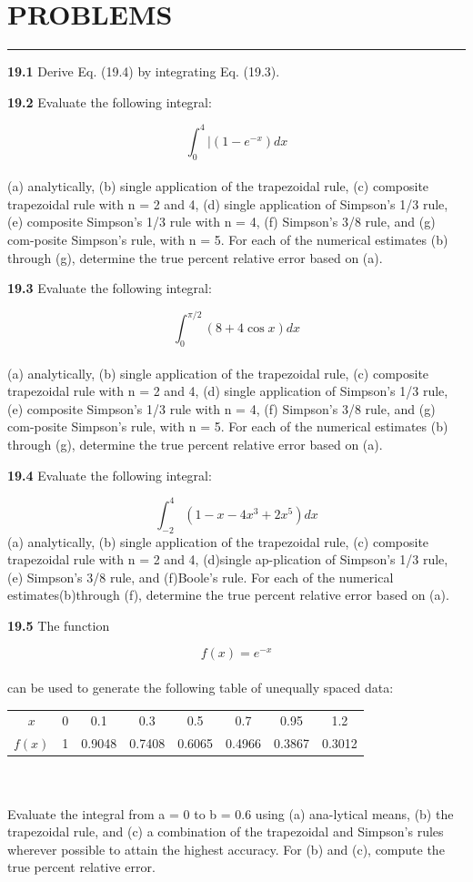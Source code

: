 \documentclass[../main.tex]{subfiles}
\begin{document}
\section*{PROBLEMS} \hrule

\begin{multicols}{2}
\textbf{19.1} Derive Eq. (19.4) by integrating Eq. (19.3).

\textbf{19.2} Evaluate the following integral:

	$$\int^{4}_{0}|(1-e^{-x})dx$$\\
(a) analytically, (b) single application of the trapezoidal rule,
(c) composite trapezoidal rule with n = 2 and 4, (d) single
application of Simpson's 1/3 rule, (e) composite Simpson's
1/3 rule with n = 4, (f) Simpson's 3/8 rule, and (g) com-posite Simpson's rule, with n = 5. For each of the numerical
estimates (b) through (g), determine the true percent relative
error based on (a).

\textbf{19.3} Evaluate the following integral:

	$$\int^{\pi/2}_{0}(8+4\cos{x})dx$$\\	
(a) analytically, (b) single application of the trapezoidal rule,
(c) composite trapezoidal rule with n = 2 and 4, (d) single
application of Simpson's 1/3 rule, (e) composite Simpson's
1/3 rule with n = 4, (f) Simpson's 3/8 rule, and (g) com-posite Simpson's rule, with n = 5. For each of the numerical
estimates (b) through (g), determine the true percent relative
error based on (a).

\textbf{19.4} Evaluate the following integral:
	
	$$\int^{4}_{-2}(1-x-4x^{3}+2x^5)dx$$
(a) analytically, (b) single application of the trapezoidal rule,
(c) composite trapezoidal rule with n = 2 and 4, (d)single ap-plication of Simpson's 1/3 rule, (e) Simpson's 3/8 rule, and
(f)Boole's rule. For each of the numerical estimates(b)through
(f), determine the true percent relative error based on (a).

\textbf{19.5} The function

	$$f(x)=e^{-x}$$\\
can be used to generate the following table of unequally spaced data:\\
\begin{tabular}{cccccccc}
	\hline
\tiny{$x$} & \tiny{0} & \tiny{0.1} & \tiny{0.3} & \tiny{0.5} & \tiny{0.7} & \tiny{0.95} & \tiny{1.2}\\
\tiny{$f(x)$} & \tiny{1} & \tiny{0.9048} & \tiny{0.7408} & \tiny{0.6065} & \tiny{0.4966} & \tiny{0.3867} & \tiny{0.3012}\\ \hline
\end{tabular}\\
\vspace{0.1pt}\\
Evaluate the integral from a = 0 to b = 0.6 using (a) ana-lytical means, (b) the trapezoidal rule, and (c) a combination
of the trapezoidal and Simpson's rules wherever possible to
attain the highest accuracy. For (b) and (c), compute the true
percent relative error.


\end{multicols}
\end{document}
